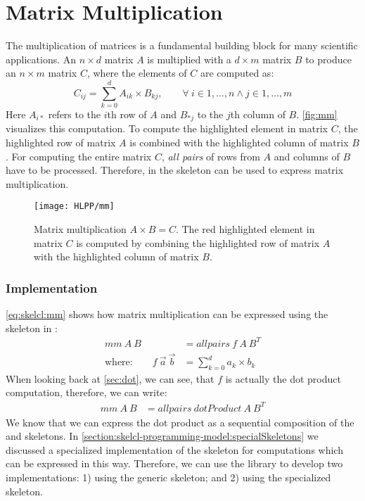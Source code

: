 \section{Matrix Multiplication}

The multiplication of matrices is a fundamental building block for many scientific applications.
An $n\times d$ matrix $A$ is multiplied with a $d\times m$ matrix $B$ to produce an $n\times m$ matrix $C$, where the elements of $C$ are computed as:
\begin{equation*}
  C_{ij} = \sum_{k=0}^{d} A_{ik} \times B_{kj}, \qquad \forall\ i \in 1, \ldots, n \wedge j \in 1, \ldots, m
\end{equation*}
Here $A_{i*}$ refers to the $i$th row of $A$ and $B_{*j}$ to the $j$th column of $B$.
\autoref{fig:mm} visualizes this computation.
To compute the highlighted element in matrix $C$, the highlighted row of matrix $A$ is combined with the highlighted column of matrix $B$.
For computing the entire matrix $C$, \emph{all pairs} of rows from $A$ and columns of $B$ have to be processed.
Therefore, in \SkelCL the \allpairs skeleton can be used to express matrix multiplication.

\begin{figure}[tb]
  \centering
  \texttt{[image: HLPP/mm]}
  \caption[Visalization of matrix multiplication.]%
          {Matrix multiplication $A\times B = C$.
           The red highlighted element in matrix $C$ is computed by combining the highlighted row of matrix $A$ with the highlighted column of matrix $B$.}
  \label{fig:mm}
\end{figure}


\subsubsection*{\SkelCL Implementation}
\autoref{eq:skelcl:mm} shows how matrix multiplication can be expressed using the \allpairs skeleton in \SkelCL:
\begin{align}
  \label{eq:skelcl:mm}
  mm\ A\ B &= allpairs\ f\ A\ B^T\\
  \text{where:} \qquad f\ \vec{a}\ \vec{b} &= \sum_{k=0}^d a_k \times b_k \nonumber
\end{align}
When looking back at \autoref{sec:dot}, we can see, that $f$ is actually the dot product computation, therefore, we can write:
\begin{align}
  mm\ A\ B &= allpairs\ dotProduct\ A\ B^T
  \label{eq:skelcl:mm:dot}
\end{align}
We know that we can express the dot product as a sequential composition of the \zip and \reduce skeletons.
In \autoref{section:skelcl-programming-model:specialSkeletons} we discussed a specialized implementation of the \allpairs skeleton for computations which can be expressed in this way.
Therefore, we can use the \SkelCL library to develop two implementations:
1) using the generic \allpairs skeleton; and 2) using the specialized \allpairs skeleton.

